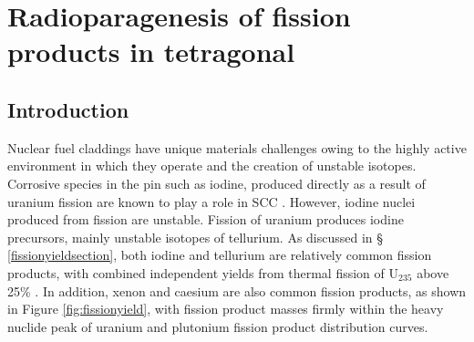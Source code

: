 \chapter{Radioparagenesis of fission products in tetragonal \zirconia}

\label{ch:results3}

\section{Introduction}


Nuclear fuel claddings have unique materials challenges owing to the highly active environment in which they operate and the creation of unstable isotopes. Corrosive species in the pin such as iodine, produced directly as a result of uranium fission are known to play a role in SCC \cite{Sidky1998, Fregonese1998, iodinezrmetal}. However, iodine nuclei produced from fission are unstable. Fission of uranium produces iodine precursors, mainly unstable isotopes of tellurium. As discussed in § \ref{fissionyieldsection}, both iodine and tellurium are relatively common fission products, with combined independent yields from thermal fission of U$_{235}$ above 25\% \cite{kennett1956mass, iodine129fissionyield, imanishi1976independent, iaeafissionyield, iodine132, amiel1975odd}. In addition, xenon and caesium are also common fission products, as shown in Figure \ref{fig:fissionyield}, with fission product masses firmly within the heavy nuclide peak of uranium and plutonium fission product distribution curves.   

